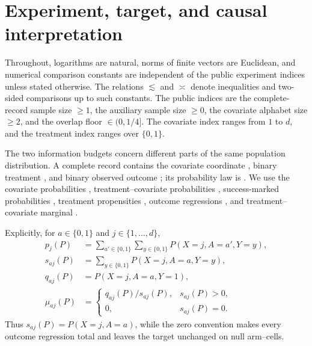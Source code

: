 \section{Experiment, target, and causal interpretation}

Throughout, logarithms are natural, norms of finite vectors are Euclidean, and numerical comparison constants are independent of the public experiment indices unless stated otherwise. The relations \(\lesssim\) and \(\asymp\) denote inequalities and two-sided comparisons up to such constants. The public indices are the complete-record sample size \(\ge1\), the auxiliary sample size \(\ge0\), the covariate alphabet size \(\ge2\), and the overlap floor \(\in(0,1/4]\). The covariate index  ranges from \(1\) to \(d\), and the treatment index  ranges over \(\{0,1\}\).

The two information budgets concern different parts of the same population distribution. A complete record contains the covariate coordinate , binary treatment , and binary observed outcome ; its probability law is . We use the covariate probabilities , treatment--covariate probabilities , success-marked probabilities , treatment propensities , outcome regressions , and treatment--covariate marginal .

Explicitly, for \(a\in\{0,1\}\) and \(j\in\{1,\ldots,d\}\),
\[
\begin{aligned}
p_j(P)&=\sum_{a'\in\{0,1\}}\sum_{y\in\{0,1\}}P(X=j,A=a',Y=y),\\
s_{aj}(P)&=\sum_{y\in\{0,1\}}P(X=j,A=a,Y=y),\\
q_{aj}(P)&=P(X=j,A=a,Y=1),\\
\mu_{aj}(P)&=
\begin{cases}
q_{aj}(P)/s_{aj}(P),&s_{aj}(P)>0,\\
0,&s_{aj}(P)=0.
\end{cases}
\end{aligned}
\]
Thus \(s_{aj}(P)=P(X=j,A=a)\), while the zero convention makes every outcome regression total and leaves the target unchanged on null arm--cells.



